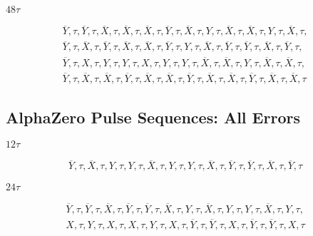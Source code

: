 \noindent $48\tau$

\begin{equation*}
\begin{aligned}
    \overline{Y}, \tau, \overline{Y}, \tau, \overline{X}, \tau, \overline{X}, \tau, \overline{X}, \tau, \overline{Y}, \tau, \overline{X}, \tau, Y, \tau, \overline{X}, \tau, \overline{X}, \tau, Y, \tau, \overline{X}, \tau, \\
    \overline{Y}, \tau, \overline{X}, \tau, \overline{Y}, \tau, \overline{X}, \tau, \overline{X}, \tau, \overline{Y}, \tau, Y, \tau, \overline{X}, \tau,
    \overline{Y}, \tau, \overline{Y}, \tau, \overline{X}, \tau, \overline{Y}, \tau, \\
    \overline{Y}, \tau, X, \tau, Y, \tau, Y, \tau, X, \tau, Y, \tau, Y, \tau, \overline{X}, \tau, \overline{X}, \tau, Y, \tau, \overline{X}, \tau, \overline{X}, \tau, \\
    \overline{Y}, \tau, \overline{X}, \tau, \overline{X}, \tau, \overline{Y}, \tau, \overline{X}, \tau, \overline{X}, \tau, \overline{Y}, \tau,
    \overline{X}, \tau, \overline{X}, \tau, \overline{Y}, \tau, \overline{X}, \tau, \overline{X}, \tau
\end{aligned}
\end{equation*}



\subsection{AlphaZero Pulse Sequences: All Errors}

\noindent $12\tau$

\begin{equation*}
\begin{aligned}
    \overline{Y}, \tau, \overline{X}, \tau, Y, \tau, Y, \tau, \overline{X}, \tau, Y, \tau, Y, \tau, \overline{X}, \tau, \overline{Y}, \tau, \overline{Y}, \tau, \overline{X}, \tau, \overline{Y}, \tau
\end{aligned}
\end{equation*}

\noindent $24\tau$

\begin{equation*}
\begin{aligned}
    \overline{Y}, \tau, \overline{Y}, \tau, \overline{X}, \tau, \overline{Y}, \tau, \overline{Y}, \tau, \overline{X}, \tau, Y, \tau, \overline{X}, \tau, Y, \tau, Y, \tau, \overline{X}, \tau, Y, \tau, \\
    X, \tau, Y, \tau, X, \tau, X, \tau, Y, \tau, X, \tau, \overline{Y}, \tau, \overline{Y}, \tau, X, \tau, \overline{Y}, \tau, \overline{Y}, \tau, X, \tau\\
\end{aligned}
\end{equation*}

